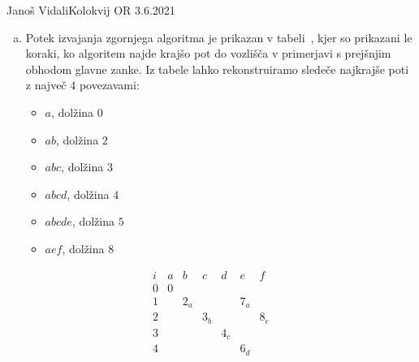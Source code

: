 \begin{naloga}{Janoš Vidali}{Kolokvij OR 3.6.2021}
\begin{odgovor}
\begin{enumerate}[(a)]
\item Potek izvajanja zgornjega algoritma je prikazan v tabeli~\tab,
kjer so prikazani le koraki,
ko algoritem najde krajšo pot do vozlišča
v primerjavi s prejšnjim obhodom glavne zanke.
Iz tabele lahko rekonstruiramo sledeče najkrajše poti z največ $4$ povezavami:
\begin{itemize}
\item $a$, dolžina $0$
\item $ab$, dolžina $2$
\item $abc$, dolžina $3$
\item $abcd$, dolžina $4$
\item $abcde$, dolžina $5$
\item $aef$, dolžina $8$
\end{itemize}
\end{enumerate}
%
\begin{tabela}
$$
\begin{array}{c|cccccc}
i & a & b & c & d & e & f \\ \hline
0 & 0 &&&&& \\
1 && 2_a &&& 7_a & \\
2 &&& 3_b &&& 8_e \\
3 &&&& 4_c && \\
4 &&&&& 6_d &
\end{array}
$$
\end{tabela}
\end{odgovor}
\end{naloga}
